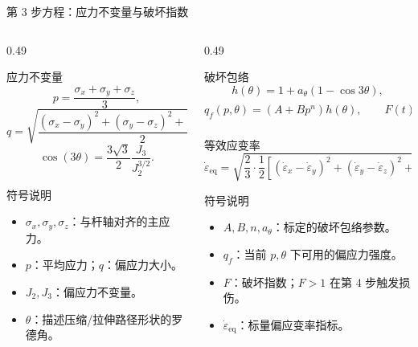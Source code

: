 \documentclass[11pt,aspectratio=169]{beamer}
\begin{document}
\begin{frame}{第 3 步方程：应力不变量与破坏指数}
  \scriptsize
  \begin{columns}[T,onlytextwidth]
    \begin{column}{0.49\textwidth}
      \begin{block}{应力不变量}
        \[
          p=\frac{\sigma_x+\sigma_y+\sigma_z}{3},
        \]
        \[
          q=\sqrt{\frac{(\sigma_x-\sigma_y)^2+
          (\sigma_y-\sigma_z)^2+(\sigma_z-\sigma_x)^2}{2}} .
        \]
        \[
          \cos(3\theta)=\frac{3\sqrt{3}}{2}\frac{J_3}{J_2^{3/2}} .
        \]
      \end{block}
      \begin{block}{符号说明}
        \begin{itemize}
          \item $\sigma_x,\sigma_y,\sigma_z$：与杆轴对齐的主应力。
          \item $p$：平均应力；$q$：偏应力大小。
          \item $J_2,J_3$：偏应力不变量。
          \item $\theta$：描述压缩/拉伸路径形状的罗德角。
        \end{itemize}
      \end{block}
    \end{column}
    \begin{column}{0.49\textwidth}
      \begin{exampleblock}{破坏包络}
        \[
          h(\theta)=1+a_\theta\left(1-\cos3\theta\right),
        \]
        \[
          q_f(p,\theta)=\left(A+Bp^n\right)h(\theta),
          \qquad
          F(t)=\frac{q(t)}{q_f(t)} .
        \]
      \end{exampleblock}
      \begin{block}{等效应变率}
        \[
          \dot{\varepsilon}_{\mathrm{eq}}=
          \sqrt{\frac{2}{3}\cdot\frac{1}{2}
          \left[
          (\dot{\varepsilon}_x-\dot{\varepsilon}_y)^2+
          (\dot{\varepsilon}_y-\dot{\varepsilon}_z)^2+
          (\dot{\varepsilon}_z-\dot{\varepsilon}_x)^2
          \right]} .
        \]
      \end{block}
      \begin{block}{符号说明}
        \begin{itemize}
          \item $A,B,n,a_\theta$：标定的破坏包络参数。
          \item $q_f$：当前 $p,\theta$ 下可用的偏应力强度。
          \item $F$：破坏指数；$F>1$ 在第 4 步触发损伤。
          \item $\dot{\varepsilon}_{\mathrm{eq}}$：标量偏应变率指标。
        \end{itemize}
      \end{block}
    \end{column}
  \end{columns}
\end{frame}
\end{document}
